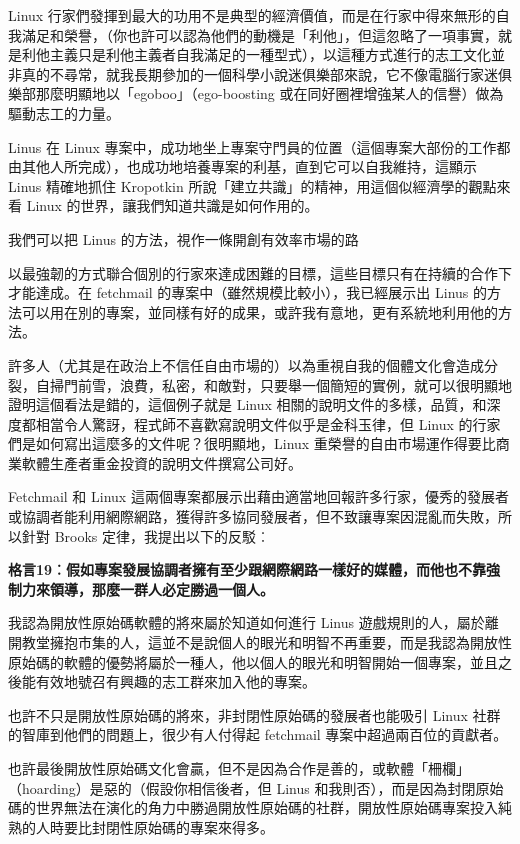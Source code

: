 \documentclass[12pt,]{article}
\makeatletter
\newcommand*{\shifttext}[2]{%
  \settowidth{\@tempdima}{#2}%
  \makebox[\@tempdima]{\hspace*{#1}#2}%
}
\makeatother
\begin{document}
Linux
行家們發揮到最大的功用不是典型的經濟價值，而是在行家中得來無形的自我滿足和榮譽，（你也許可以認為他們的動機是「利他」，但這忽略了一項事實，就是利他主義只是利他主義者自我滿足的一種型式），以這種方式進行的志工文化並非真的不尋常，就我長期參加的一個科學小說迷俱樂部來說，它不像電腦行家迷俱樂部那麼明顯地以「egoboo」（ego-boosting
或在同好圈裡增強某人的信譽）做為驅動志工的力量。

Linus 在 Linux
專案中，成功地坐上專案守門員的位置（這個專案大部份的工作都由其他人所完成），也成功地培養專案的利基，直到它可以自我維持，這顯示
Linus 精確地抓住 Kropotkin
所說「建立共識」的精神，用這個似經濟學的觀點來看 Linux
的世界，讓我們知道共識是如何作用的。

我們可以把 Linus 的方法，視作一條開創有效率市場的路 \shifttext{1pt}{---}\shifttext{-1pt}{---}
以最強韌的方式聯合個別的行家來達成困難的目標，這些目標只有在持續的合作下才能達成。在
fetchmail 的專案中（雖然規模比較小），我已經展示出 Linus
的方法可以用在別的專案，並同樣有好的成果，或許我有意地，更有系統地利用他的方法。

許多人（尤其是在政治上不信任自由市場的）以為重視自我的個體文化會造成分裂，自掃門前雪，浪費，私密，和敵對，只要舉一個簡短的實例，就可以很明顯地證明這個看法是錯的，這個例子就是
Linux
相關的說明文件的多樣，品質，和深度都相當令人驚訝，程式師不喜歡寫說明文件似乎是金科玉律，但
Linux 的行家們是如何寫出這麼多的文件呢？很明顯地，Linux
重榮譽的自由市場運作得要比商業軟體生產者重金投資的說明文件撰寫公司好。

Fetchmail 和 Linux
這兩個專案都展示出藉由適當地回報許多行家，優秀的發展者或協調者能利用網際網路，獲得許多協同發展者，但不致讓專案因混亂而失敗，所以針對
Brooks 定律，我提出以下的反駁︰

\textbf{格言19︰假如專案發展協調者擁有至少跟網際網路一樣好的媒體，而他也不靠強制力來領導，那麼一群人必定勝過一個人。}

我認為開放性原始碼軟體的將來屬於知道如何進行 Linus
遊戲規則的人，屬於離開教堂擁抱市集的人，這並不是說個人的眼光和明智不再重要，而是我認為開放性原始碼的軟體的優勢將屬於一種人，他以個人的眼光和明智開始一個專案，並且之後能有效地號召有興趣的志工群來加入他的專案。

也許不只是開放性原始碼的將來，非封閉性原始碼的發展者也能吸引 Linux
社群的智庫到他們的問題上，很少有人付得起 fetchmail
專案中超過兩百位的貢獻者。

也許最後開放性原始碼文化會贏，但不是因為合作是善的，或軟體「柵欄」（hoarding）是惡的（假設你相信後者，但
Linus
和我則否），而是因為封閉原始碼的世界無法在演化的角力中勝過開放性原始碼的社群，開放性原始碼專案投入純熟的人時要比封閉性原始碼的專案來得多。
\end{document}
